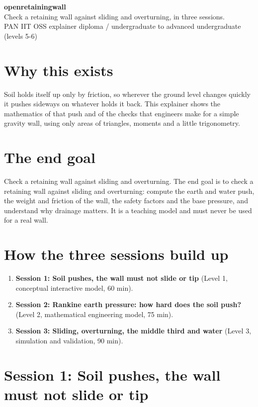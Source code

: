 \documentclass[11pt,a4paper]{article}
\begin{document}
\begin{center}{\LARGE\bfseries openretainingwall}\\[0.4em]{\large Check a retaining wall against sliding and overturning, in three sessions.}\\[0.2em]\small PAN IIT OSS explainer \textbullet{} diploma / undergraduate to advanced undergraduate (levels 5-6)\end{center}

\section*{Why this exists}
Soil holds itself up only by friction, so wherever the ground level changes quickly it pushes sideways on whatever holds it back. This explainer shows the mathematics of that push and of the checks that engineers make for a simple gravity wall, using only areas of triangles, moments and a little trigonometry.

\section*{The end goal}
Check a retaining wall against sliding and overturning. The end goal is to check a retaining wall against sliding and overturning: compute the earth and water push, the weight and friction of the wall, the safety factors and the base pressure, and understand why drainage matters. It is a teaching model and must never be used for a real wall.

\section*{How the three sessions build up}
\begin{enumerate}[nosep]
\item \textbf{Session 1: Soil pushes, the wall must not slide or tip} (Level 1, conceptual interactive model, 60 min).
\item \textbf{Session 2: Rankine earth pressure: how hard does the soil push?} (Level 2, mathematical engineering model, 75 min).
\item \textbf{Session 3: Sliding, overturning, the middle third and water} (Level 3, simulation and validation, 90 min).
\end{enumerate}

\section{Session 1: Soil pushes, the wall must not slide or tip}
\end{document}
